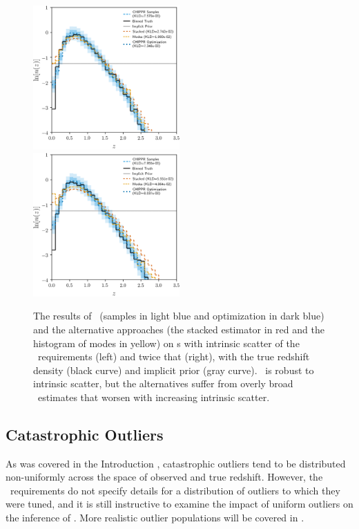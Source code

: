 \begin{figure}
	\includegraphics[width=0.5\textwidth]{figures/chippr/results_scatter1.png}
	\includegraphics[width=0.5\textwidth]{figures/chippr/results_scatter2.png}
	\caption{
		The results of \Chippr\ (samples in light blue and optimization in dark blue) and the alternative approaches (the stacked estimator in red and the histogram of modes in yellow) on \pzpdf s with intrinsic scatter of the \lsst\ requirements (left) and twice that (right), with the true redshift density (black curve) and implicit prior (gray curve).
		\Chippr\ is robust to intrinsic scatter, but the alternatives suffer from overly broad \nz\ estimates that worsen with increasing intrinsic scatter.
	}
\end{figure}

\subsection{Catastrophic Outliers}

As was covered in the Introduction , catastrophic outliers tend to be distributed non-uniformly across the space of observed and true redshift.
However, the \lsst\ requirements do not specify details for a distribution of outliers to which they were tuned, and it is still instructive to examine the impact of uniform outliers on the inference of \nz.
More realistic outlier populations will be covered in .

